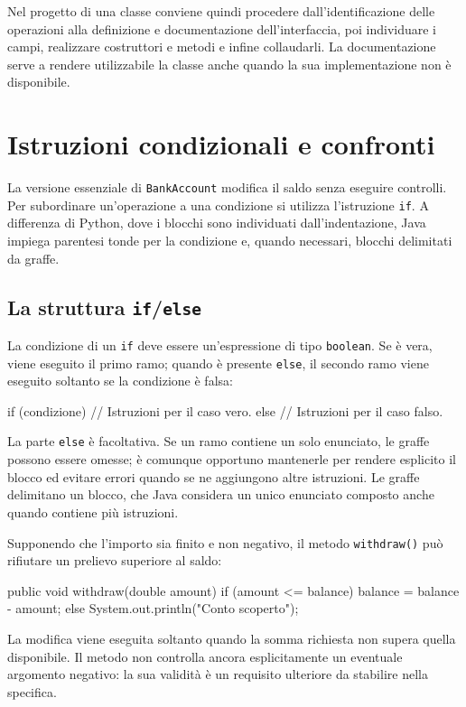 Nel progetto di una classe conviene quindi procedere
dall'identificazione delle operazioni alla definizione e
documentazione dell'interfaccia, poi individuare i campi,
realizzare costruttori e metodi e infine collaudarli.
La documentazione serve a rendere utilizzabile la classe
anche quando la sua implementazione non è disponibile.

\section{Istruzioni condizionali e confronti}
\label{sec:fi-java-classi-condizioni}

La versione essenziale di \texttt{BankAccount} modifica
il saldo senza eseguire controlli. Per subordinare
un'operazione a una condizione si utilizza l'istruzione
\texttt{if}. A differenza di Python, dove i blocchi
sono individuati dall'indentazione, Java impiega
parentesi tonde per la condizione e, quando necessari,
blocchi delimitati da graffe.

\subsection{La struttura \texttt{if}/\texttt{else}}
\label{sec:fi-java-classi-if-else}

La condizione di un \texttt{if} deve essere un'espressione
di tipo \texttt{boolean}. Se è vera, viene eseguito il
primo ramo; quando è presente \texttt{else}, il secondo
ramo viene eseguito soltanto se la condizione è falsa:

\begin{unipdcode}[language=Java]
if (condizione) {
    // Istruzioni per il caso vero.
} else {
    // Istruzioni per il caso falso.
}
\end{unipdcode}

La parte \texttt{else} è facoltativa. Se un ramo
contiene un solo enunciato, le graffe possono essere
omesse; è comunque opportuno mantenerle per rendere
esplicito il blocco ed evitare errori quando se ne
aggiungono altre istruzioni. Le graffe delimitano un blocco,
che Java considera un unico enunciato composto anche quando
contiene più istruzioni.

\begin{example}
Supponendo che l'importo sia finito e non negativo, il metodo
\texttt{withdraw()} può rifiutare un prelievo superiore
al saldo:
\begin{unipdcode}[language=Java]
public void withdraw(double amount) {
    if (amount <= balance) {
        balance = balance - amount;
    } else {
        System.out.println("Conto scoperto");
    }
}
\end{unipdcode}
La modifica viene eseguita soltanto quando la somma
richiesta non supera quella disponibile. Il metodo
non controlla ancora esplicitamente un eventuale
argomento negativo: la sua validità è un requisito
ulteriore da stabilire nella specifica.
\end{example}

